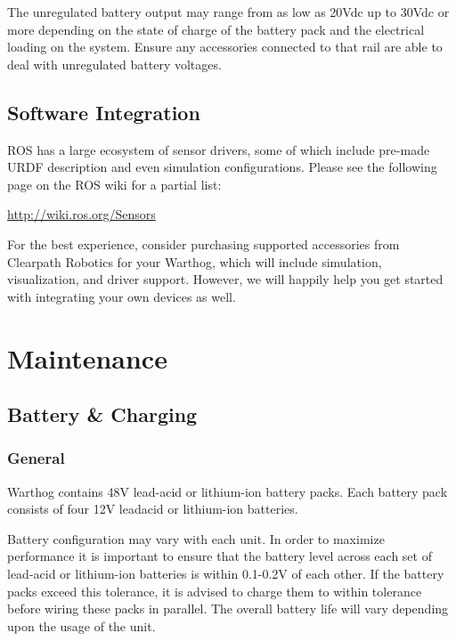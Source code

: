 \documentclass[]{clearpath-latex/clearpath-manual}
\begin{document}
\begin{warning}
The unregulated battery output may range from as low as 20Vdc up to 30Vdc or more depending on the state of charge of the battery pack and the electrical loading on the system. Ensure any accessories connected to that rail are able to deal with unregulated battery voltages.
\end{warning}


\subsection{Software Integration}

ROS has a large ecosystem of sensor drivers, some of which include pre-made URDF description and even simulation configurations.  Please see the following page on the ROS wiki for a partial list:

\url{http://wiki.ros.org/Sensors}

For the best experience, consider purchasing supported accessories from Clearpath Robotics for your Warthog, which will include simulation, visualization, and driver support.  However, we will happily help you get started with integrating your own devices as well.

\section{Maintenance}

\subsection{Battery \& Charging}

\subsubsection{General}

Warthog contains 48V lead-acid or lithium-ion battery packs. Each battery pack consists of four 12V leadacid or lithium-ion batteries.

Battery configuration may vary with each unit. In order to maximize performance it is important to ensure that the battery level across each set of lead-acid or lithium-ion batteries is within 0.1-0.2V of each other. If the battery packs exceed this tolerance, it is advised to charge them to within tolerance before wiring these packs
in parallel. The overall battery life will vary depending upon the usage of the unit.
\end{document}
